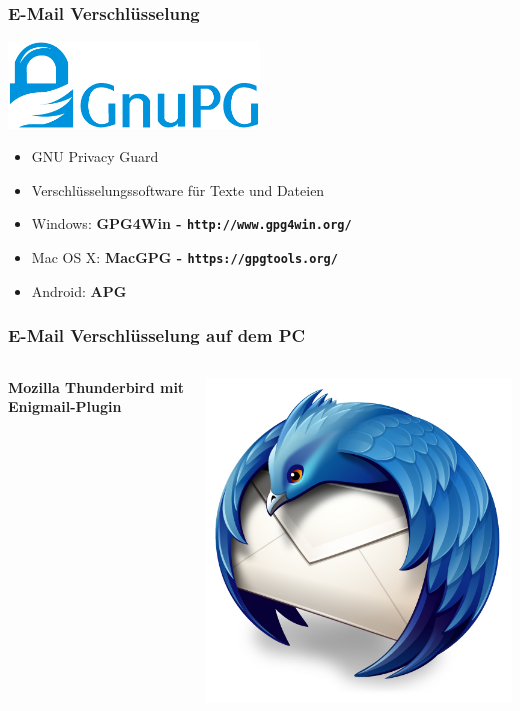 \documentclass[12pt]{beamer}
\begin{document}
\begin{frame}
   \frametitle{E-Mail Verschlüsselung}
   \vspace{-1cm}
   \begin{center}
      \includegraphics[width=0.5\textwidth]{img/Gnupg_logo}
   \end{center}
   \begin{itemize}
      \item GNU Privacy Guard
      \item Verschlüsselungssoftware für Texte und Dateien
      \item Windows: \textbf{GPG4Win - \texttt{http://www.gpg4win.org/}}
      \item Mac OS X: \textbf{MacGPG - \texttt{https://gpgtools.org/}}
      \item Android: \textbf{APG}
   \end{itemize}
\end{frame}

\begin{frame}
   \frametitle{E-Mail Verschlüsselung auf dem PC}
   \begin{columns}[T]
      \column{5cm}
      \textbf{\Large{}Mozilla Thunderbird mit Enigmail-Plugin}{\Large \par}
      \column{2cm}
      \includegraphics[width=1\textwidth]{img/Mozilla_Thunderbird_3}
   \end{columns}
\end{frame}
\end{document}
